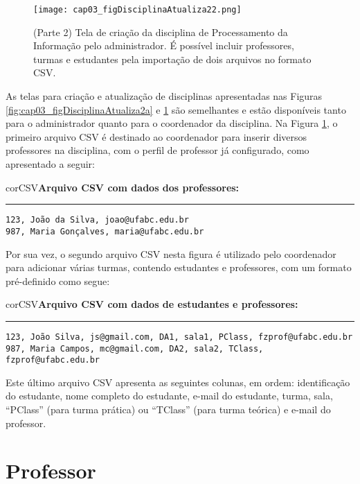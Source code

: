 \begin{figure}[!ht]
  \centering
  \texttt{[image: cap03\_figDisciplinaAtualiza22.png]}
  \caption{(Parte 2) Tela de criação da disciplina de Processamento da Informação pelo administrador. É possível incluir professores, turmas e estudantes pela importação de dois arquivos no formato CSV.}
  \label{fig:cap03_figDisciplinaAtualiza22}
\end{figure}

As telas para criação e atualização de disciplinas apresentadas nas Figuras \ref{fig:cap03_figDisciplinaAtualiza2a} e \ref{fig:cap03_figDisciplinaAtualiza22} são semelhantes e estão disponíveis tanto para o administrador quanto para o coordenador da disciplina. 
Na Figura \ref{fig:cap03_figDisciplinaAtualiza22}, o primeiro arquivo CSV é destinado ao coordenador para inserir diversos professores na disciplina, com o perfil de professor já configurado, como apresentado a seguir:
\begin{myboxCode}{corCSV}{\textbf{Arquivo CSV com dados dos professores:}}\vspace{3mm}
\hrule
\begin{verbatim}
123, João da Silva, joao@ufabc.edu.br
987, Maria Gonçalves, maria@ufabc.edu.br
\end{verbatim}
\end{myboxCode}

Por sua vez, o segundo arquivo CSV nesta figura é utilizado pelo coordenador para adicionar várias turmas, contendo estudantes e professores, com um formato pré-definido como segue:
\begin{myboxCode}{corCSV}{\textbf{Arquivo CSV com dados de estudantes e professores:}}\vspace{3mm}
\hrule
\begin{verbatim}
123, João Silva, js@gmail.com, DA1, sala1, PClass, fzprof@ufabc.edu.br
987, Maria Campos, mc@gmail.com, DA2, sala2, TClass, fzprof@ufabc.edu.br
\end{verbatim}
\end{myboxCode}

Este último arquivo CSV apresenta as seguintes colunas, em ordem: identificação do estudante, nome completo do estudante, e-mail do estudante, turma, sala, ``PClass'' (para turma prática) ou ``TClass'' (para turma teórica) e e-mail do professor.


\section{Professor} \label{sec:professor}

